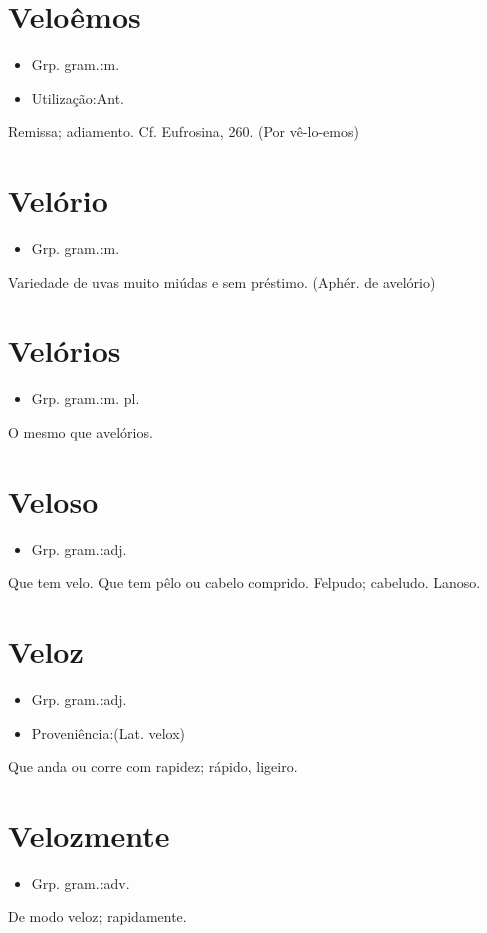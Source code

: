 \documentclass{article}
\begin{document}
\section{Veloêmos}
\begin{itemize}
\item {Grp. gram.:m.}
\end{itemize}
\begin{itemize}
\item {Utilização:Ant.}
\end{itemize}
Remissa; adiamento. Cf. \textunderscore Eufrosina\textunderscore , 260.
(Por \textunderscore vê-lo-emos\textunderscore )
\section{Velório}
\begin{itemize}
\item {Grp. gram.:m.}
\end{itemize}
Variedade de uvas muito miúdas e sem préstimo.
(Aphér. de \textunderscore avelório\textunderscore )
\section{Velórios}
\begin{itemize}
\item {Grp. gram.:m. pl.}
\end{itemize}
O mesmo que \textunderscore avelórios\textunderscore .
\section{Veloso}
\begin{itemize}
\item {Grp. gram.:adj.}
\end{itemize}
Que tem velo.
Que tem pêlo ou cabelo comprido.
Felpudo; cabeludo.
Lanoso.
\section{Veloz}
\begin{itemize}
\item {Grp. gram.:adj.}
\end{itemize}
\begin{itemize}
\item {Proveniência:(Lat. \textunderscore velox\textunderscore )}
\end{itemize}
Que anda ou corre com rapidez; rápido, ligeiro.
\section{Velozmente}
\begin{itemize}
\item {Grp. gram.:adv.}
\end{itemize}
De modo veloz; rapidamente.
\end{document}
